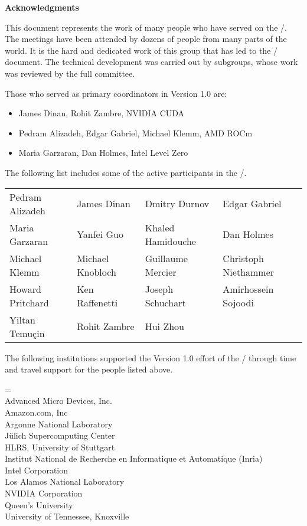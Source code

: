 {\Huge\noindent\textbf{Acknowledgments}}%
{}

\vspace{0.5in}



This document represents the work of many people who have served on
the \MPIHACC/.  The meetings have been attended by dozens of people
from many parts of the world. It is the hard and dedicated work of
this group that has led to the \MEMALLOCDOC/ document. The technical
development was carried out by subgroups, whose work was reviewed by
the full committee.

Those who served as primary coordinators in Version 1.0 are:

\begin{itemize}
\item James Dinan, Rohit Zambre, NVIDIA CUDA
\item Pedram Alizadeh, Edgar Gabriel, Michael Klemm, AMD ROCm
\item Maria Garzaran, Dan Holmes, Intel Level Zero
\end{itemize}

The following list includes some of the active participants in
the \MPIHACC/.

\begin{center}
\begin{tabular}{llll}
Pedram Alizadeh &
James Dinan &
Dmitry Durnov &
Edgar Gabriel \\
Maria Garzaran &
Yanfei Guo &
Khaled Hamidouche &
Dan Holmes \\
Michael Klemm &
Michael Knobloch &
Guillaume Mercier &
Christoph Niethammer \\
Howard Pritchard &
Ken Raffenetti &
Joseph Schuchart &
Amirhossein Sojoodi \\
Yiltan Temuçin &
Rohit Zambre &
Hui Zhou
\end{tabular}
\end{center}

The following institutions supported the Version 1.0 effort
of the \MEMALLOCDOC/ through time and travel support for the people
listed above.

\medskip

\begin{obeylines}\leftskip=\parindent\parindent=0pt %
Advanced Micro Devices, Inc.
Amazon.com, Inc
Argonne National Laboratory
Jülich Supercomputing Center
HLRS, University of Stuttgart
Institut National de Recherche en Informatique et Automatique (Inria)
Intel Corporation
Los Alamos National Laboratory
NVIDIA Corporation
Queen's University
University of Tennessee, Knoxville
\end{obeylines}
